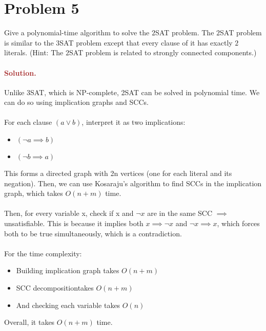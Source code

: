 \section*{Problem 5}
Give a polynomial-time algorithm to solve the $2$SAT problem. The $2$SAT problem is similar to the $3$SAT problem except that every clause of it has exactly $2$ literals. (Hint: The $2$SAT problem is related to strongly connected components.)

\paragraph{\textcolor{brown}{Solution.}}
Unlike 3SAT, which is NP-complete, 2SAT can be solved in polynomial time. We can do so using implication graphs and SCCs.
\\ \\ For each clause $(a \lor b)$, interpret it as two implications: \begin{itemize} \item $(\neg a \implies b)$ \item $(\neg b \implies a)$ \end{itemize} This forms a directed graph with 2n vertices (one for each literal and its negation). Then, we can use Kosaraju’s algorithm to find SCCs in the implication graph, which takes $O(n+m)$ time. 
\\ \\ Then, for every variable x, check if x and $\neg x$ are in the same SCC $\implies$ unsatisfiable. This is because it implies both $x \implies \neg x$ and $\neg x \implies x$, which forces both to be true simultaneously, which is a contradiction. 
\\ \\ For the time complexity: \begin{itemize} \item Building implication graph takes $O(n+m)$ \item SCC decompositiontakes $O(n+m)$ \item And checking each variable takes $O(n)$ \end{itemize} Overall, it takes $O(n+m)$ time.

